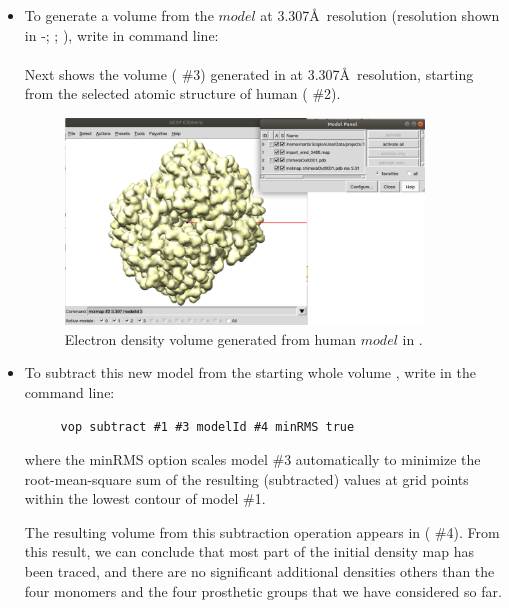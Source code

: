 \begin{itemize}
  \begin{itemize}
  
  \item To generate a volume from the $model$ at 3.307\AA\ resolution (resolution shown in \phenix-; ; ), write in \chimera command line:\\
  
  \\
  
  Next  shows the volume ( \#3) generated in \chimera at 3.307\AA\ resolution, starting from the selected atomic structure of human  ( \#2). 
   
  \begin{figure}[H]
    \centering 
    \captionsetup{width=.7\linewidth} 
    \includegraphics[width=0.90\textwidth]{Images/Fig43}
    \caption{Electron density volume generated from human  $model$ in \chimera.}
    \label{fig:chimera_operate_vol_2}
   \end{figure}
  
  \item To subtract this new model from the starting whole volume , write in \chimera the command line:
  
  \begin{verbatim}
     vop subtract #1 #3 modelId #4 minRMS true
  \end{verbatim}
  where the minRMS option scales model \#3 automatically to minimize the root-mean-square sum of the resulting (subtracted) values at grid points within the lowest contour of model \#1.
  
  The resulting volume from this subtraction operation appears in  ( \#4). From this result, we can conclude that most part of the initial density map has been traced, and there are no significant additional densities others than the four monomers and the four prosthetic groups that we have considered so far.
  

\end{itemize}
\end{itemize}
